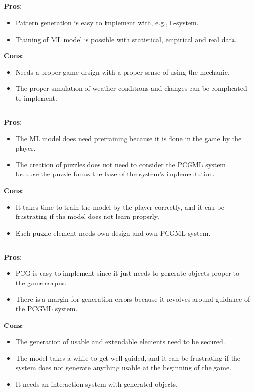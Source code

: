 \documentclass[MGS,Master,english]{twbook}%
\begin{document}
\subsection{}
\textbf{Pros:}
\begin{itemize}
	\item Pattern generation is easy to implement with, e.g., L-system.
	\item Training of ML model is possible with statistical, empirical and real data.
\end{itemize}
\textbf{Cons:}
\begin{itemize}
	\item Needs a proper game design with a proper sense of using the mechanic.
	\item The proper simulation of weather conditions and changes can be complicated to implement.
\end{itemize}

\subsection{}
\textbf{Pros:}
\begin{itemize}
	\item The ML model does need pretraining because it is done in the game by the player.
	\item The creation of puzzles does not need to consider the PCGML system because the puzzle forms the base of the system's implementation.
\end{itemize}
\textbf{Cons:}
\begin{itemize}
	\item It takes time to train the model by the player correctly, and it can be frustrating if the model does not learn properly.
	\item Each puzzle element needs own design and own PCGML system.
\end{itemize}

\subsection{}
\textbf{Pros:}
\begin{itemize}
	\item PCG is easy to implement since it just needs to generate objects proper to the game corpus.
	\item There is a margin for generation errors because it revolves around guidance of the PCGML system.
\end{itemize}
\textbf{Cons:}
\begin{itemize}
	\item The generation of usable and extendable elements need to be secured.
	\item The model takes a while to get well guided, and it can be frustrating if the system does not generate anything usable at the beginning of the game.
	\item It needs an interaction system with generated objects.
\end{itemize}
\end{document}
